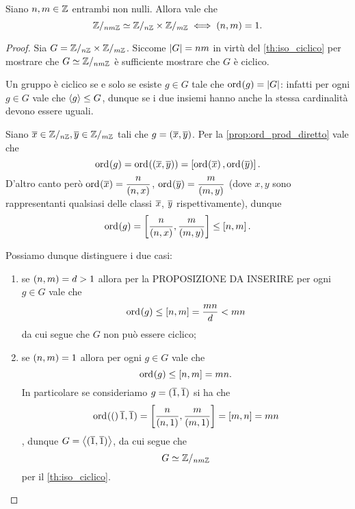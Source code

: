 \begin{theorem}
     \label{th:cinese_III}
    Siano $n, m \in \Z$ entrambi non nulli. Allora vale che \[
        \Zmod{nm} \isomorph \Zmod{n}\times \Zmod{m} \iff \mcd{n}{m} = 1.
    \]
\end{theorem}
\begin{proof}
    Sia $G = \Zmod n \times \Zmod m$. Siccome $\abs*{G} = nm$ in virtù del \autoref{th:iso_ciclico} per mostrare che $G \isomorph \Zmod{nm}$ è sufficiente mostrare che $G$ è ciclico.

    Un gruppo è ciclico se e solo se esiste $g \in G$ tale che $\ord{g} = \abs G$: infatti per ogni $g \in G$ vale che $\gen*{g} \sgr G$, dunque se i due insiemi hanno anche la stessa cardinalità devono essere uguali.

    Siano $\eqcl x \in \Zmod n, \eqcl y \in \Zmod m$ tali che $g = (\eqcl x, \eqcl y)$. Per la \autoref{prop:ord_prod_diretto} vale che \[
        \ord{g} = \ord{(\eqcl x, \eqcl y)} = \mcm{\ord{\eqcl x}}{\ord{\eqcl y}}.    
    \]
    D'altro canto però $\ord{\eqcl x} = \dfrac{n}{\mcd{n}{x}}$, $\ord{\eqcl y} = \dfrac{m}{\mcd{m}{y}}$ (dove $x, y$ sono rappresentanti qualsiasi delle classi $\eqcl x$, $\eqcl y$ rispettivamente), dunque \[
        \ord g = \mcm{\dfrac{n}{\mcd{n}{x}}}{\dfrac{m}{\mcd{m}{y}}} \sgr \mcm{n}{m}. 
    \]

    Possiamo dunque distinguere i due casi: \begin{enumerate}
        \item se $\mcd{n}{m} = d > 1$ allora per la PROPOSIZIONE DA INSERIRE per ogni $g \in G$ vale che \[
            \ord g \sgr \mcm{n}{m} = \frac{mn}{d} < mn    
        \] da cui segue che $G$ non può essere ciclico;
        \item se $\mcd{n}{m} = 1$ allora per ogni $g \in G$ vale che \[
            \ord g \sgr \mcm{n}{m} = mn.    
        \] In particolare se consideriamo $g = (\eqcl 1, \eqcl 1)$ si ha che \[
            \ord(\eqcl 1, \eqcl 1) = \mcm{\frac{n}{\mcd{n}{1}}}{\frac{m}{\mcd{m}{1}}} = \mcm{m}{n} = mn  
        \], dunque $G = \gen*{(\eqcl 1, \eqcl 1)}$, da cui segue che \[
            G \isomorph \Zmod{nm}    
        \] per il \autoref{th:iso_ciclico}. \qedhere
    \end{enumerate} 
\end{proof}


